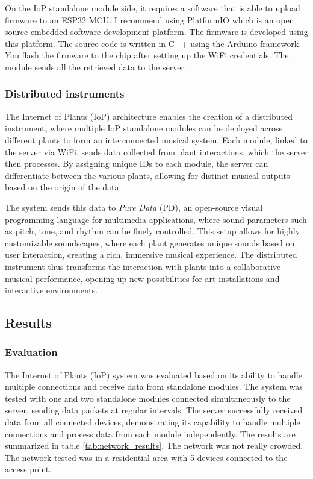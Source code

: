 On the IoP standalone module side, it requires a software that is able to upload
firmware to an ESP32 MCU. I recommend using PlatformIO which is an open source
embedded software development platform. The firmware is developed using this platform.
The source code is written in C++ using the Arduino framework. You flash the firmware
to the chip after setting up the WiFi credentials.
The module sends all the retrieved data to the server.

\subsubsection{Distributed instruments}

The Internet of Plants (IoP) architecture enables the creation of a distributed instrument, where multiple IoP standalone modules can be deployed across different plants to form an interconnected musical system. Each module, linked to the server via WiFi, sends data collected from plant interactions, which the server then processes. By assigning unique IDs to each module, the server can differentiate between the various plants, allowing for distinct musical outputs based on the origin of the data.

The system sends this data to \textit{Pure Data} (PD), an open-source visual programming language for multimedia applications, where sound parameters such as pitch, tone, and rhythm can be finely controlled. This setup allows for highly customizable soundscapes, where each plant generates unique sounds based on user interaction, creating a rich, immersive musical experience. The distributed instrument thus transforms the interaction with plants into a collaborative musical performance, opening up new possibilities for art installations and interactive environments.

\subsection{Results}

\subsubsection{Evaluation}

The Internet of Plants (IoP) system was evaluated based on its ability to handle multiple connections and receive data from standalone modules. The system was tested with one and two standalone modules connected simultaneously to the server, sending data packets at regular intervals. The server successfully received data from all connected devices, demonstrating its capability to handle multiple connections and process data from each module independently. The results are summarized in table \ref{tab:network_results}.
The network was not really crowded. The network tested was in a residential area with 5 devices connected to the access point.

